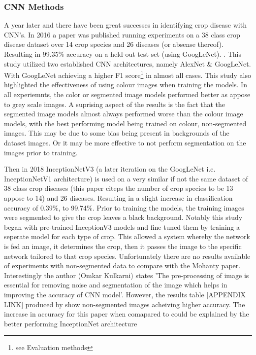   \subsubsection{CNN Methods}
    A year later and there have been great successes in identifying crop disease with CNN's. In 2016 a paper was published running experiments on a 38 class crop disease dataset over 14 crop species and 26 diseases (or absense thereof). Resulting in 99.35\% accuracy on a held-out test set (using GoogLeNet). \citep{Mohanty2016}. This study utilized two established CNN architectures, namely AlexNet \citep{Krizhevsky} \& GoogLeNet. \citep{Szegedy_2015_CVPR} With GoogLeNet achieving a higher F1 score\footnote{see Evaluation methods} in almost all cases.
    This study also highlighted the effectiveness of using colour images when training the models. In all experiemnts, the color or segmented image models performed better as appose to grey scale images. A suprising aspect of the results is the fact that the segmented image models almost always performed worse than the colour image models, with the best performing model being trained on colour, non-segmented images. This may be due to some bias being present in backgrounds of the dataset images. Or it may be more effective to not perform segmentation on the images prior to training.
    \par
    Then in 2018 InceptionNetV3 (a later iteration on the GoogLeNet i.e. InceptionNetV1 architecture) is used on a very similar if not the same dataset of 38 class crop diseases (this paper citeps the number of crop species to be 13 appose to 14) and 26 diseases. Resulting in a slight increase in classification accuracy of 0.39\%, to 99.74\%. \citep{Kulkarni2018}
    Prior to training the models, the training images were segmented to give the crop leaves a black background.
    Notably this study began with pre-trained InceptionV3 models and fine tuned them by training a seperate model for each type of crop. This allowed a system whereby the network is fed an image, it determines the crop, then it passes the image to the specific network tailored to that crop species.
    Unfortunately there are no results available of experiments with non-segmented data to compare with the Mohanty paper. Interestingly the author (Omkar Kulkarni) states 'The pre-processing of image is essential for removing noise and segmentation of the image which helps in improving the accuracy of CNN model'. However, the results table [APPENDIX LINK] produced by \citep{Mohanty2016} show non-segmented images acheiving higher accuracy. The increase in accuracy for this paper when comapared to \citep{Mohanty2016} could be explained by the better performing InceptionNet architecture %
